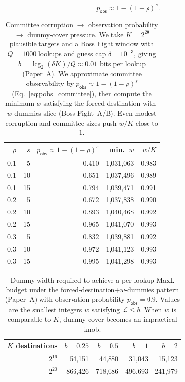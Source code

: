\documentclass[11pt]{article}
\newcommand{\MaxL}{\mathcal{L}}
\begin{document}
\begin{equation}\label{eq:pobs_committee}
p_{\mathsf{obs}} \approx 1-(1-\rho)^s.
\end{equation}

\begin{table}[t]
\centering
\caption{Committee corruption $\to$ observation probability $\to$ dummy-cover pressure. We take $K=2^{20}$ plausible targets and a Boss Fight window with $Q=1000$ lookups and guess cap $\delta=10^{-3}$, giving $b=\log_2(\delta K)/Q\approx 0.01$ bits per lookup (Paper~A). We approximate committee observability by $p_{\mathsf{obs}}\approx 1-(1-\rho)^s$ (Eq.~\eqref{eq:pobs_committee}), then compute the minimum $w$ satisfying the forced-destination-with-$w$-dummies slice (Boss Fight~A/B)\cite{series:bossfightA,series:bossfightB}. Even modest corruption and committee sizes push $w/K$ close to $1$.}
\label{tab:committee-to-dummy}
\begin{tabular}{r r r r r}
\toprule
$\rho$ & $s$ & $p_{\mathsf{obs}}\approx 1-(1-\rho)^s$ & min.\ $w$ & $w/K$ \\
\midrule
0.1 & 5 & 0.410 & 1,031,063 & 0.983 \\
0.1 & 10 & 0.651 & 1,037,496 & 0.989 \\
0.1 & 15 & 0.794 & 1,039,471 & 0.991 \\
0.2 & 5 & 0.672 & 1,037,838 & 0.990 \\
0.2 & 10 & 0.893 & 1,040,468 & 0.992 \\
0.2 & 15 & 0.965 & 1,041,070 & 0.993 \\
0.3 & 5 & 0.832 & 1,039,881 & 0.992 \\
0.3 & 10 & 0.972 & 1,041,123 & 0.993 \\
0.3 & 15 & 0.995 & 1,041,298 & 0.993 \\
\bottomrule
\end{tabular}
\end{table}


\begin{table}[t]
\centering
\caption{Dummy width required to achieve a per-lookup MaxL budget under the forced-destination+$w$-dummies pattern (Paper~A) with observation probability $p_{\mathsf{obs}}=0.9$. Values are the smallest integers $w$ satisfying $\MaxL\le b$. When $w$ is comparable to $K$, dummy cover becomes an impractical knob.}
\label{tab:dummy-required}
\begin{tabular}{r r r r r}
\toprule
$K$ destinations & $b{=}0.25$ & $b{=}0.5$ & $b{=}1$ & $b{=}2$\\
\midrule
$2^{16}$ & 54,151 & 44,880 & 31,043 & 15,123\\
$2^{20}$ & 866,426 & 718,086 & 496,693 & 241,979\\
\bottomrule
\end{tabular}
\end{table}
\end{document}
